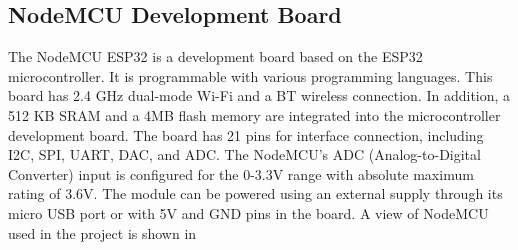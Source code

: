 \subsection{NodeMCU Development Board}

The NodeMCU ESP32 is a development board based on the ESP32 microcontroller. It is programmable with various programming languages. This board has 2.4 GHz dual-mode Wi-Fi and a BT wireless connection. In addition, a 512 KB SRAM and a 4MB flash memory are integrated into the microcontroller development board. The board has 21 pins for interface connection, including I2C, SPI, UART, DAC, and ADC. The NodeMCU's ADC (Analog-to-Digital Converter) input is configured for the 0-3.3V range with absolute maximum rating of 3.6V. The module can be powered using an external supply through its micro USB port or with 5V and GND pins in the board. A view of NodeMCU used in the project is shown in 
\vspace{12pt}

